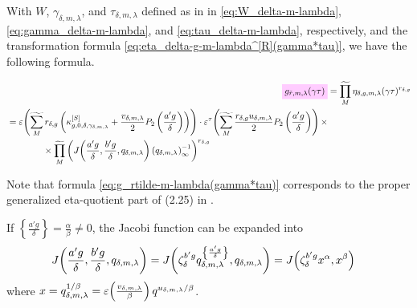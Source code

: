 \documentclass{article}
\begin{document}
With $W$, $\gamma_{\delta,m,\lambda}$, and $\tau_{\delta,m,\lambda}$
defined as in in \eqref{eq:W_delta-m-lambda},
\eqref{eq:gamma_delta-m-lambda}, and \eqref{eq:tau_delta-m-lambda},
respectively, and the transformation formula
\eqref{eq:eta_delta-g-m-lambda^[R](gamma*tau)}, we have the following
formula.

\begin{align}
  \defineNotation[g-rtilde-gamma-m-lambda-tau]{g_{\tilde{r},m,\lambda}(\gamma\tau)}
  &=
    \genprod[M]
    \eta_{\delta,g,m,\lambda}(\gamma\tau)^{r_{\delta,g}}
  \notag\\
  \begin{split}
  &=
    \unityPower{
      \gensum[M]
      r_{\delta,g}
      \left(
      \kappa_{g,0,\delta,\gamma_{\delta,m,\lambda}}^{[S]}
      +
      \frac{v_{\delta,m,\lambda}}{2} P_2\left(\frac{a' g}{\delta}\right)
      \right)}
  \cdot
  \unityPowerTau{
    \gensum[M]
    \frac{r_{\delta,g} u_{\delta,m,\lambda}}{2} P_2\left(\frac{a' g}{\delta}\right)}
  \times
  \\
  &\qquad\qquad
  \times
  \genprod[M]
  \left(
    \jacobiAlpha{\frac{a' g}{\delta}}{\frac{b' g}{\delta}}{q_{\delta,m,\lambda}}
    \eulerFunction[q_{\delta,m,\lambda}]{}^{-1}
  \right)^{r_{\delta,g}}
  \end{split}
  \label{eq:g_rtilde-m-lambda(gamma*tau)}
\end{align}

Note that formula \eqref{eq:g_rtilde-m-lambda(gamma*tau)} corresponds
to the proper generalized eta-quotient part of (2.25) in
\cite{ChenDuZhao_FindingModularFunctionsRamanujan_2019}.

If $\left\{\frac{a'g}{\delta}\right\} = \frac{\alpha}{\beta} \ne 0$,
the Jacobi function can be expanded into
\begin{align}
  J\!\left(\frac{a' g}{\delta},\frac{b' g}{\delta},q_{\delta,m,\lambda}\right)
  &=
  J\!\left(
      \zeta_\delta^{b' g} q_{\delta,m,\lambda}^{\left\{\frac{a' g}{\delta}\right\}}
      ,q_{\delta,m,\lambda}\right)
  =
    J\!\left(\zeta_\delta^{b' g} x^{\alpha},x^{\beta}\right)
    \label{eq:minimalRootOfUnity-g_rtilde-m-lambda}
\end{align}
where
$x = q_{\delta,m,\lambda}^{1/\beta} =
\varepsilon\!\left(\frac{v_{\delta,m,\lambda}}{\beta}\right) q^{u_{\delta,m,\lambda}/\beta}$.
\end{document}
